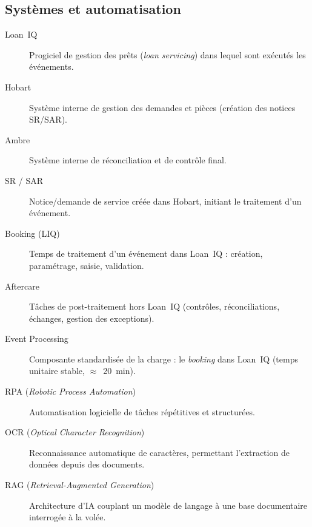 \subsection*{Systèmes et automatisation}
\begin{description}
  \item[Loan~IQ] Progiciel de gestion des prêts (\textit{loan servicing}) dans lequel sont exécutés les événements.
  \item[Hobart] Système interne de gestion des demandes et pièces (création des notices SR/SAR). %
  \item[Ambre] Système interne de réconciliation et de contrôle final. %
  \item[SR / SAR] Notice/demande de service créée dans Hobart, initiant le traitement d'un événement. %
  \item[Booking (LIQ)] Temps de traitement d'un événement dans Loan~IQ : création, paramétrage, saisie, validation.
  \item[Aftercare] Tâches de post-traitement hors Loan~IQ (contrôles, réconciliations, échanges, gestion des exceptions).
  \item[Event Processing] Composante standardisée de la charge : le \textit{booking} dans Loan~IQ (temps unitaire stable, $\approx$~20~min).
  \item[RPA (\textit{Robotic Process Automation})] Automatisation logicielle de tâches répétitives et structurées.
  \item[OCR (\textit{Optical Character Recognition})] Reconnaissance automatique de caractères, permettant l'extraction de données depuis des documents.
  \item[RAG (\textit{Retrieval-Augmented Generation})] Architecture d'IA couplant un modèle de langage à une base documentaire interrogée à la volée.
\end{description}

